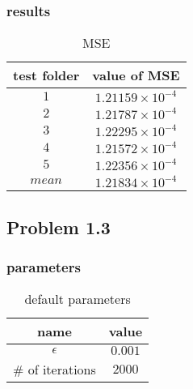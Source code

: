 \documentclass[a4paper,11pt]{article}
\begin{document}
\subsubsection*{results}
\begin{table}[H]
	\begin{center}
		\caption{MSE}
		\begin{tabular}{cc}
			\toprule[2pt]
			test folder&	value of MSE \\ 
			\hline 
			$1$ &	$1.21159\times 10^{-4}$  \\ 
			$2$ & 	$1.21787\times 10^{-4}$  \\ 
			$3$ & 	$1.22295\times 10^{-4}$  \\ 
			$4$ & 	$1.21572\times 10^{-4}$	 \\
			$5$ & 	$1.22356\times 10^{-4}$  \\
			\hline
			$mean$& 	$1.21834\times 10^{-4}$  \\
			\bottomrule[2pt]
		\end{tabular} 
	\end{center}
\end{table}
\par
\subsection*{Problem 1.3}
\subsubsection*{parameters}
\begin{table}[H]
	\begin{center}
		\caption{default parameters}
		\begin{tabular}{cc}
			\toprule[2pt]
			name & value\\
			\hline
			$\epsilon$&$0.001$\\
			$\#$ of iterations&$2000$\\
			\bottomrule[2pt]
		\end{tabular} 
	\end{center}
\end{table}
\par
\end{document}
